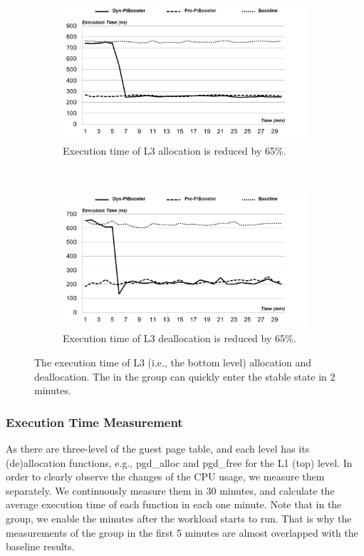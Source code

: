 \begin{figure}[t!]
    \centering
    \begin{subfigure}[t]{0.5\textwidth}
        \centering
        \includegraphics[height=2.0in]{image/micro/PTEalloc.png}
        \caption{Execution time of L3 allocation is reduced by 65\%.}
        \label{fig:l3a}
    \end{subfigure}%
    ~
    \begin{subfigure}[t]{0.5\textwidth}
        \centering
        \includegraphics[height=2.0in]{image/micro/PTEfree.png}
        \caption{Execution time of L3 deallocation is reduced by 65\%.}
        \label{fig:l3b}
    \end{subfigure}
    \caption{The execution time of L3 (i.e., the bottom level) allocation and deallocation. The \name in the \dynname group can quickly enter the stable state in 2 minutes.}
    \label{fig:PTEtime}
\end{figure}

\subsubsection{Execution Time Measurement}
As there are three-level of the guest page table, and each level has its (de)allocation functions, e.g., pgd\_alloc and pgd\_free for the L1 (top) level.
In order to clearly observe the changes of the CPU usage, we measure them separately.
We continuously measure them in 30 minutes, and calculate the average execution time of each function in each one minute.
Note that in the \dynname group, we enable the  minutes after the workload starts to run.
That is why the measurements of the \dynname group in the first 5 minutes are almost overlapped with the baseline results.


